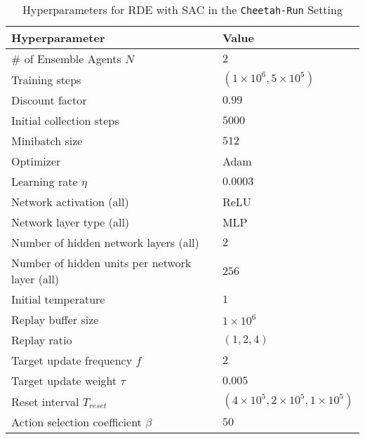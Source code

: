\documentclass[base]{subfiles}
\begin{document}
\begin{table}[h]
	\caption{Hyperparameters for RDE with SAC in the \texttt{Cheetah-Run} Setting}
	\label{tab:cheetah_hyp}
	\centering
	\begin{tabular}{l|l}
		\toprule
		Hyperparameter                                 & Value                                           \\
		\hline
		\# of Ensemble Agents $N$                      & $2$                                             \\
		Training steps                                 & $(1 \times 10^6, 5 \times 10^5)$                \\
		Discount factor                                & $0.99$                                          \\
		Initial collection steps                       & $5000$                                          \\
		Minibatch size                                 & $512$                                           \\
		Optimizer                                      & Adam                                            \\
		Learning rate $\eta$                           & $0.0003$                                        \\
		Network activation (all)                       & ReLU                                            \\
		Network layer type (all)                       & MLP                                             \\
		Number of hidden network layers (all)          & $2$                                             \\
		Number of hidden units per network layer (all) & $256$                                           \\
		Initial temperature                            & $1$                                             \\
		Replay buffer size                             & $1 \times 10^6$                                 \\
		Replay ratio                                   & $(1,2,4)$                                       \\
		Target update frequency $f$                    & $2$                                             \\
		Target update weight $\tau$                    & $0.005$                                         \\
		Reset interval $T_{reset}$                     & $(4 \times 10^5, 2 \times 10^5, 1 \times 10^5)$ \\
		Action selection coefficient $\beta$           & $50$                                            \\
		\bottomrule
	\end{tabular}
\end{table}
\end{document}
